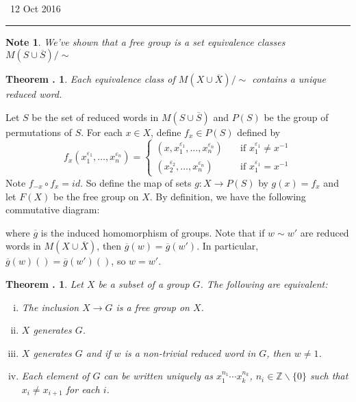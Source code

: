 \documentclass[twoside]{report}
\newcommand{\Z}{\mathbb{Z}}
\newcommand{\eps}{\varepsilon}
\newcounter{Lecture}
\newcommand{\newLec}[1]{
  \stepcounter{Lecture}
  \noindent{\Large\bf Lecture \arabic{Lecture}} \, #1 \hfill  \rule[1ex]{2.5in}{.1pt} \vspace{1em}
}
\theoremstyle{myts}
\newcounter{c}[Lecture]
\newtheorem{thm}[c]{Theorem \arabic{Lecture}.}
\newtheorem*{nte}{Note}
\newcounter{ex}
\newenvironment{prf}{
  \noindent\begin{mdframed}[style=prf]}{\end{mdframed} \vspace{1em}
}
\begin{document}
\newLec{12 Oct 2016}

\begin{nte}
  We've shown that a free group is a set equivalence classes \( M( S \cup \overline{S} )/ \sim \)
\end{nte}

\begin{thm}
  Each equivalence class of \( M(X\cup\overline{X}) / \sim \) contains a unique reduced word.
\end{thm}

\begin{prf}
  Let $S$ be the set of reduced words in $M(S\cup\overline{S})$ and $P(S)$ be the group of permutations of $S$. For each \( x\in X \), define \( f_x \in P(S) \) defined by
  \[
    f_x(x_1^{\eps_1}, \ldots, x_n^{\eps_n}) =
    \begin{cases}
      (x, x_1^{\eps_1}, \ldots, x_n^{\eps_n} ) &\quad \textrm{if } x_1^{\eps_1} \neq x^{-1} \\
      (x_2^{\eps_2}, \ldots, x_n^{\eps_n} ) &\quad \textrm{if } x_1^{\eps_1} = x^{-1}
    \end{cases}
  \]
  Note \( f_{-x} \circ f_x = id \). So define the map of sets \( g: X\to P(S) \) by \(g(x)=f_x\) and let $F(X)$ be the free group on $X$. By definition, we have the following commutative diagram:
  \begin{center}
  \end{center}
  where $\overline{g}$ is the induced homomorphism of groups. Note that if $w\sim w'$ are reduced words in \( M(X\cup \overline{X}) \), then \(\overline{g}(w)=\overline{g}(w')\). In particular, \( \overline{g}(w)() = \overline{g}(w')() \), so \(w=w'\).
\end{prf}

\begin{thm}
  Let $X$ be a subset of a group $G$. The following are equivalent:
  \begin{enumerate}[(i)]
    \item The inclusion \( X \to G \) is a free group on $X$.
    \item $X$ generates $G$.
    \item $X$ generates $G$ and if $w$ is a non-trivial reduced word in $G$, then $w\neq1$.
    \item Each element of $G$ can be written uniquely as \( x_1^{n_1} \cdots x_k^{n_k} \), \(n_i\in\Z\backslash\{0\}\) such that \( x_i \neq x_{i+1} \) for each $i$.
  \end{enumerate}
\end{thm}
\end{document}
